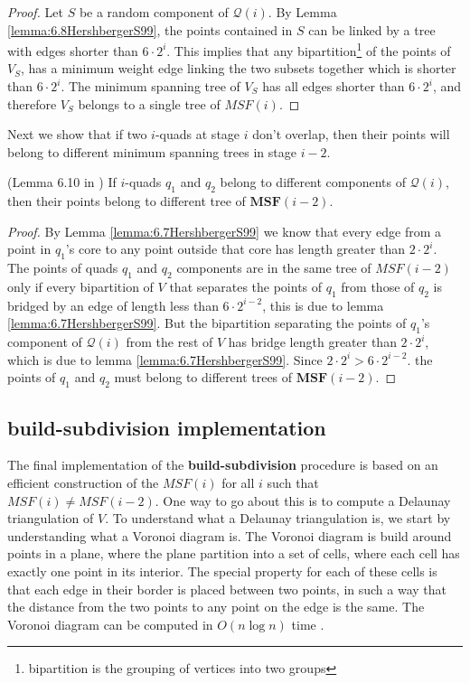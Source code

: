 \begin{proof}
Let $S$ be a random component of $\mathcal{Q}(i)$. By Lemma \ref{lemma:6.8HershbergerS99}, the points 
contained in $S$ can be linked by a tree with edges shorter than $6 \cdot 2^i$. This implies that 
any bipartition\footnote{bipartition is the grouping of vertices into two groups} of the points of 
$V_S$, has a minimum weight edge linking the two subsets together which is shorter than $6 \cdot 2^i$. 
The minimum spanning tree of $V_S$ has all edges shorter than $6 \cdot 2^i$, and therefore $V_S$ 
belongs to a single tree of $MSF(i)$.
\end{proof}

Next we show that if two $i$-quads at stage $i$ don't overlap, then their points will belong to 
different minimum spanning trees in stage $i-2$.

\begin{Lemma} (Lemma 6.10 in \cite{HershbergerS99}) \label{lemma:6.10HershbergerS99}
If $i$-quads $q_1$ and $q_2$ belong to different components of $\mathcal{Q}(i)$, then their points 
belong to different tree of $\mathbf{MSF}(i-2)$.
\end{Lemma}

\begin{proof}
By Lemma \ref{lemma:6.7HershbergerS99} we know that every edge from a point in $q_1$'s core to any point 
outside that core has length greater than $2 \cdot 2^i$. The points of quads $q_1$ and $q_2$ components 
are in the same tree of $MSF(i-2)$ only if every bipartition of $V$ that separates the points of $q_1$ 
from those of $q_2$ is bridged by an edge of length less than $6 \cdot 2^{i-2}$, this is due to lemma 
\ref{lemma:6.7HershbergerS99}. But the bipartition separating the points of $q_1$'s component of 
$\mathcal{Q}(i)$ from the rest of $V$ has bridge length greater than $2 \cdot 2^i$, which is due to 
lemma \ref{lemma:6.7HershbergerS99}. Since $2 \cdot 2^i > 6 \cdot 2^{i-2}$. the points of $q_1$ and 
$q_2$ must belong to different trees of $\mathbf{MSF}(i-2)$.
\end{proof}

\subsection{\textbf{build-subdivision} implementation}

The final implementation of the \textbf{build-subdivision} procedure is based on an efficient 
construction of the $MSF(i)$ for all $i$ such that $MSF(i) \neq MSF(i-2)$. One way to go 
about this is to compute a Delaunay triangulation of $V$. To understand what a Delaunay triangulation 
is, we start by understanding what a Voronoi diagram is. The Voronoi diagram is build around points in a 
plane, where the plane partition into a set of cells, where each cell has exactly one point in its 
interior. The special property for each of these cells is that each edge in their border is placed 
between two points, in such a way that the distance from the two points to any point on the edge is the 
same. The Voronoi diagram can be computed in $O(n \log n)$ time \cite{CompGeo}. 

